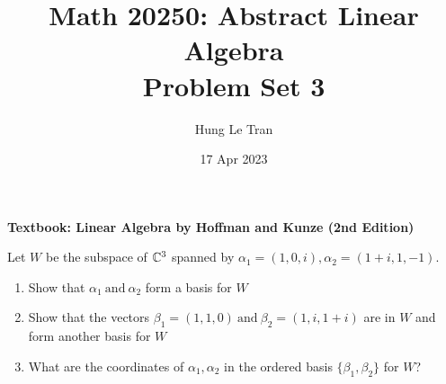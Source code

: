 \documentclass[a4paper, 11pt]{article}
\title{Math 20250: Abstract Linear Algebra \\ \large Problem Set 3}
\date{17 Apr 2023}
\author{Hung Le Tran}
\begin{document}
\maketitle
\newpage
\setcounter{section}{3}
\textbf{Textbook: Linear Algebra by Hoffman and Kunze (2nd Edition)}
\begin{problem} 
    Let \(W\) be the subspace of \(\mathbb{C}^3\) spanned by \(\alpha_1 = (1, 0, i), \alpha_2 = (1+i, 1, -1)\). \begin{enumerate} [label=(\alph*)]
        \item Show that \(\alpha_1 \:\text{and}\: \alpha_2 \) form a basis for \(W\)
        \item Show that the vectors \(\beta_1 = (1, 1, 0) \:\text{and}\: \beta_2 = (1, i, 1+i)\) are in \(W\) and form another basis for \(W\)
        \item What are the coordinates of \(\alpha_1, \alpha_2\) in the ordered basis \(\{\beta_1, \beta_2\}\) for \(W\)?
    \end{enumerate}
\end{problem}
\end{document}
